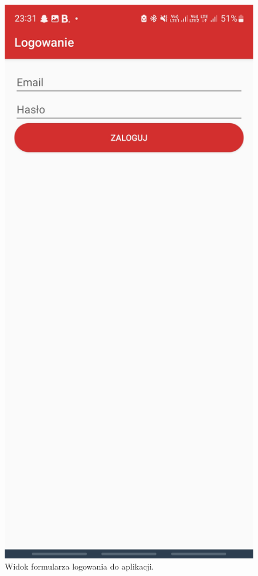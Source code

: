 \begin{figure}[H]
    \centering
    \includegraphics[scale=0.15]{img/imp/widok-log.jpg}
    \caption{Widok formularza logowania do aplikacji.}
    \label{widok:login}
\end{figure}

